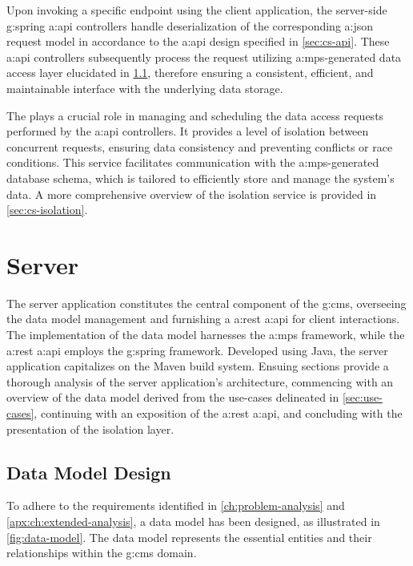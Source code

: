 Upon invoking a specific endpoint using the client application, the server-side \gls{g:spring} \gls{a:api} controllers handle deserialization of the corresponding \gls{a:json} request model in accordance to the \gls{a:api} design specified in \cref{sec:cs-api}. These \gls{a:api} controllers subsequently process the request utilizing \gls{a:mps}-generated data access layer elucidated in \cref{sec:cs-data-model}, therefore ensuring a consistent, efficient, and maintainable interface with the underlying data storage.

The  plays a crucial role in managing and scheduling the data access requests performed by the \gls{a:api} controllers. It provides a level of isolation between concurrent requests, ensuring data consistency and preventing conflicts or race conditions. This service facilitates communication with the \gls{a:mps}-generated database schema, which is tailored to efficiently store and manage the system's data. A more comprehensive overview of the isolation service is provided in \cref{sec:cs-isolation}.
\vspace{-.15cm} %

\section{Server}

The server application constitutes the central component of the \gls{g:cms}, overseeing the data model management and furnishing a \gls{a:rest} \gls{a:api} for client interactions. The implementation of the data model harnesses the \gls{a:mps} framework, while the \gls{a:rest} \gls{a:api} employs the \gls{g:spring} framework. Developed using Java, the server application capitalizes on the Maven build system. Ensuing sections provide a thorough analysis of the server application's architecture, commencing with an overview of the data model derived from the use-cases delineated in \cref{sec:use-cases}, continuing with an exposition of the \gls{a:rest} \gls{a:api}, and concluding with the presentation of the isolation layer.

\subsection{Data Model Design}\label{sec:cs-data-model}

To adhere to the requirements identified in \cref{ch:problem-analysis} and \cref{apx:ch:extended-analysis}, a data model has been designed, as illustrated in \cref{fig:data-model}. The data model represents the essential entities and their relationships within the \gls{g:cms} domain.
\vspace{-.25cm} %

